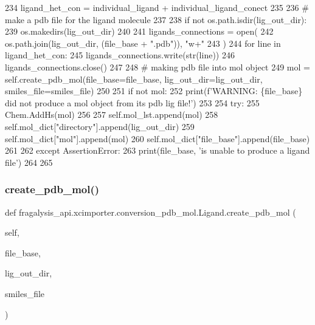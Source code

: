 \begin{DoxyCode}
234         ligand\_het\_con = individual\_ligand + individual\_ligand\_conect
235 
236         \textcolor{comment}{# make a pdb file for the ligand molecule}
237 
238         \textcolor{keywordflow}{if} \textcolor{keywordflow}{not} os.path.isdir(lig\_out\_dir):
239             os.makedirs(lig\_out\_dir)
240 
241         ligands\_connections = open(
242             os.path.join(lig\_out\_dir, (file\_base + \textcolor{stringliteral}{".pdb"})), \textcolor{stringliteral}{"w+"}
243         )
244         \textcolor{keywordflow}{for} line \textcolor{keywordflow}{in} ligand\_het\_con:
245             ligands\_connections.write(str(line))
246         ligands\_connections.close()
247 
248         \textcolor{comment}{# making pdb file into mol object}
249         mol = self.create\_pdb\_mol(file\_base=file\_base, lig\_out\_dir=lig\_out\_dir, smiles\_file=smiles\_file)
250 
251         \textcolor{keywordflow}{if} \textcolor{keywordflow}{not} mol:
252             print(f\textcolor{stringliteral}{'WARNING: \{file\_base\} did not produce a mol object from its pdb lig file!'})
253 
254         \textcolor{keywordflow}{try}:
255             Chem.AddHs(mol)
256 
257             self.mol\_lst.append(mol)
258             self.mol\_dict[\textcolor{stringliteral}{"directory"}].append(lig\_out\_dir)
259             self.mol\_dict[\textcolor{stringliteral}{"mol"}].append(mol)
260             self.mol\_dict[\textcolor{stringliteral}{"file\_base"}].append(file\_base)
261 
262         \textcolor{keywordflow}{except} AssertionError:
263             print(file\_base, \textcolor{stringliteral}{'is unable to produce a ligand file'})
264 
265 
\end{DoxyCode}
\mbox{\label{classfragalysis__api_1_1xcimporter_1_1conversion__pdb__mol_1_1_ligand_a4603fdd993d7b6b4cebea13a5ada16c2}} 
\subsubsection{\texorpdfstring{create\+\_\+pdb\+\_\+mol()}{create\_pdb\_mol()}}
{\footnotesize\ttfamily def fragalysis\+\_\+api.\+xcimporter.\+conversion\+\_\+pdb\+\_\+mol.\+Ligand.\+create\+\_\+pdb\+\_\+mol (\begin{DoxyParamCaption}\item[{}]{self,  }\item[{}]{file\+\_\+base,  }\item[{}]{lig\+\_\+out\+\_\+dir,  }\item[{}]{smiles\+\_\+file }\end{DoxyParamCaption})}



